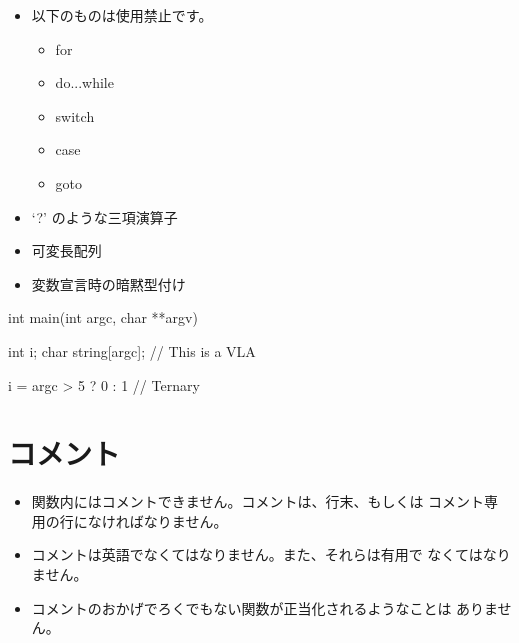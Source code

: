 \documentclass{42-ja}
\begin{document}
        \begin{itemize}

            \item 以下のものは使用禁止です。

                \begin{itemize}

                    \item for
                    \item do...while
                    \item switch
                    \item case
                    \item goto

                \end{itemize}

            \item `?' のような三項演算子

            \item 可変長配列

            \item 変数宣言時の暗黙型付け

        \end{itemize}
        \begin{42ccode}
    int main(int argc, char **argv)
    {
        int     i;
        char    string[argc]; // This is a VLA

        i = argc > 5 ? 0 : 1 // Ternary
    }
        \end{42ccode}
        \newpage

    \section{コメント}

        \begin{itemize}

            \item 関数内にはコメントできません。コメントは、行末、もしくは
				コメント専用の行になければなりません。

            \item コメントは英語でなくてはなりません。また、それらは有用で
				なくてはなりません。

            \item コメントのおかげでろくでもない関数が正当化されるようなことは
				ありません。

        \end{itemize}
        \newpage
\end{document}

